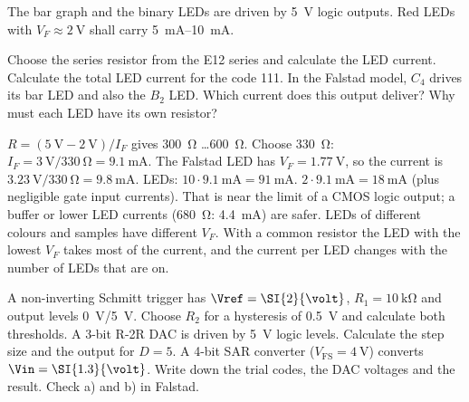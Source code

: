 The bar graph and the binary LEDs are driven by \SI{5}{\volt} logic outputs.
Red LEDs with $V_F \approx \SI{2}{\volt}$ shall carry \SIrange{5}{10}{\milli\ampere}.
\begin{talist}
\ta Choose the series resistor from the E12 series and calculate the LED current.
\ta Calculate the total LED current for the code 111.
\ta In the Falstad model, $C_4$ drives its bar LED and also the $B_2$ LED. Which current does
	this output deliver?
\ta Why must each LED have its own resistor?
\end{talist}

\begin{solution}
\begin{talist}
\ta $R = (\SI{5}{\volt}-\SI{2}{\volt})/I_F$ gives \SI{300}{\ohm} \ldots \SI{600}{\ohm}. Choose \SI{330}{\ohm}:
	$I_F = \SI{3}{\volt}/\SI{330}{\ohm} = \SI{9.1}{\milli\ampere}$.\newline
	\newline The Falstad LED has $V_F = \SI{1.77}{\volt}$, so the current is
	$\SI{3.23}{\volt}/\SI{330}{\ohm} = \SI{9.8}{\milli\ampere}$.
 LEDs: $10\cdot\SI{9.1}{\milli\ampere} = \SI{91}{\milli\ampere}$.
\ta $2\cdot\SI{9.1}{\milli\ampere} = \SI{18}{\milli\ampere}$ (plus negligible gate input currents).
	That is near the limit of a CMOS logic output; a buffer or lower LED currents
	(\SI{680}{\ohm}: \SI{4.4}{\milli\ampere}) are safer.
\ta LEDs of different colours and samples have different $V_F$. With a common resistor the
	LED with the lowest $V_F$ takes most of the current, and the current per LED changes with
	the number of LEDs that are on.
\end{talist}
\end{solution}

\begin{talist}
\ta A non-inverting Schmitt trigger has $\Vref = \SI{2}{\volt}$, $R_1 = \SI{10}{\kilo\ohm}$ and
	output levels \SI{0}{\volt}/\SI{5}{\volt}. Choose $R_2$ for a hysteresis of \SI{0.5}{\volt} and
	calculate both thresholds.
\ta A 3-bit R-2R DAC is driven by \SI{5}{\volt} logic levels. Calculate the step size and the output
	for $D = 5$.
\ta A 4-bit SAR converter ($V_\mathrm{FS} = \SI{4}{\volt}$) converts $\Vin = \SI{1.3}{\volt}$.
	Write down the trial codes, the DAC voltages and the result.
\ta Check a) and b) in Falstad.
\end{talist}

